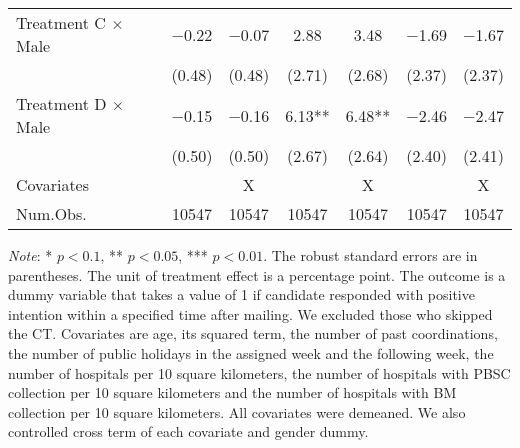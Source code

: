\documentclass[12pt, a4paper]{article}
\begin{document}
\begin{table}[H]
\begin{threeparttable}
\begin{tabular}[t]{lcccccc}
Treatment C $\times$ Male & \num{-0.22} & \num{-0.07} & \num{2.88} & \num{3.48} & \num{-1.69} & \num{-1.67}\\
 & (\num{0.48}) & (\num{0.48}) & (\num{2.71}) & (\num{2.68}) & (\num{2.37}) & (\num{2.37})\\
Treatment D $\times$ Male & \num{-0.15} & \num{-0.16} & \num{6.13}** & \num{6.48}** & \num{-2.46} & \num{-2.47}\\
 & (\num{0.50}) & (\num{0.50}) & (\num{2.67}) & (\num{2.64}) & (\num{2.40}) & (\num{2.41})\\
\midrule
Covariates &  & X &  & X &  & X\\
Num.Obs. & \num{10547} & \num{10547} & \num{10547} & \num{10547} & \num{10547} & \num{10547}\\
\bottomrule
\end{tabular}
\begin{tablenotes}
\item \emph{Note}: * $p < 0.1$, ** $p < 0.05$, *** $p < 0.01$. The robust standard errors are in parentheses. The unit of treatment effect is a percentage point. The outcome is a dummy variable that takes a value of 1 if candidate responded with positive intention within a specified time after mailing. We excluded those who skipped the CT. Covariates are age, its squared term, the number of past coordinations, the number of public holidays in the assigned week and the following week, the number of hospitals per 10 square kilometers, the number of hospitals with PBSC collection per 10 square kilometers and the number of hospitals with BM collection per 10 square kilometers. All covariates were demeaned. We also controlled cross term of each covariate and gender dummy.
\end{tablenotes}
\end{threeparttable}
\end{table}
\end{document}
